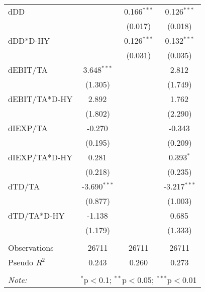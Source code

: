 \begin{table}[!htbp]
\begin{tabular}{@{\extracolsep{5pt}}lccc}
 dDD & & 0.166$^{***}$ & 0.126$^{***}$ \\
& & (0.017) & (0.018) \\
 dDD*D-HY & & 0.126$^{***}$ & 0.132$^{***}$ \\
& & (0.031) & (0.035) \\
 dEBIT/TA & 3.648$^{***}$ & & 2.812$^{}$ \\
& (1.305) & & (1.749) \\
 dEBIT/TA*D-HY & 2.892$^{}$ & & 1.762$^{}$ \\
& (1.802) & & (2.290) \\
 dIEXP/TA & -0.270$^{}$ & & -0.343$^{}$ \\
& (0.195) & & (0.209) \\
 dIEXP/TA*D-HY & 0.281$^{}$ & & 0.393$^{*}$ \\
& (0.218) & & (0.235) \\
 dTD/TA & -3.690$^{***}$ & & -3.217$^{***}$ \\
& (0.877) & & (1.003) \\
 dTD/TA*D-HY & -1.138$^{}$ & & 0.685$^{}$ \\
& (1.179) & & (1.333) \\
\hline \\[-1.8ex]
 Observations & 26711 & 26711 & 26711 \\
 Pseudo $R^2$ & 0.243 & 0.260 & 0.273 \\
\hline
\hline \\[-1.8ex]
\textit{Note:} & \multicolumn{3}{r}{$^{*}$p$<$0.1; $^{**}$p$<$0.05; $^{***}$p$<$0.01} \\
\end{tabular}
\end{table}